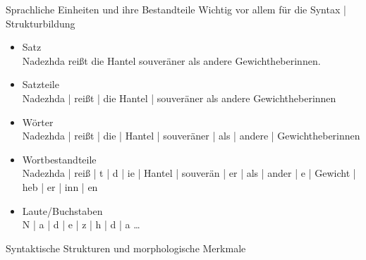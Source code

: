 \begin{frame}
  {Sprachliche Einheiten und ihre Bestandteile}
  \onslide<+->
  \onslide<+->
  Wichtig vor allem für die Syntax | \alert{Strukturbildung}\\
  \Zeile
  \begin{itemize}[<+->]
    \item\footnotesize \alert{Satz} \\
      {Nadezhda reißt die Hantel souveräner als andere Gewichtheberinnen.}
      \Halbzeile

    \item\footnotesize \alert{Satzteile} \\
      {Nadezhda | reißt | die Hantel | souveräner als andere Gewichtheberinnen}
      \Halbzeile

    \item\footnotesize \alert{Wörter} \\
      {Nadezhda | reißt | die | Hantel | souveräner | als | andere | Gewichtheberinnen}
      \Halbzeile

    \item\footnotesize \alert{Wortbestandteile} \\
      {Nadezhda | reiß | t | d | ie | Hantel | souverän | er | als | ander | e | Gewicht | heb | er | inn | en}
      \Halbzeile

    \item\footnotesize \alert{Laute\slash Buchstaben} \\
      {N | a | d | e | z | h | d | a \ldots}
  \end{itemize}
\end{frame}


\begin{frame}
  {Syntaktische Strukturen und morphologische Merkmale}
  \onslide<+->
  \onslide<+->
  \begin{center}
  \end{center}

  \Zeile
   
\end{frame}

